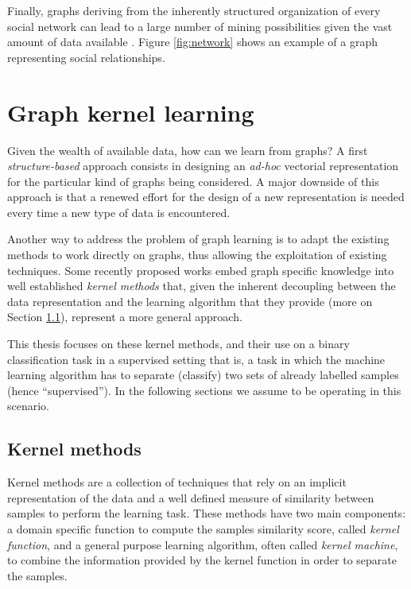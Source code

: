 Finally, graphs deriving from the inherently structured organization of every social
network can lead to a large number of mining possibilities given the vast
amount of data available \cite{gundecha2012mining}.
Figure \ref{fig:network} shows an example of a graph representing social relationships.

\section{Graph kernel learning}

Given the wealth of available data, how can we learn from graphs? A first \emph{structure-based}
approach consists in designing an \emph{ad-hoc} vectorial representation for the
particular kind of graphs being considered.
A major downside of this approach is that a renewed effort for the 
design of a new representation is needed every time a new type of data
is encountered.

Another way to address the problem of graph learning is to adapt the existing methods
to work directly on graphs, thus allowing the exploitation of existing techniques.
Some recently proposed works \cite{DBLP:conf/sdm/MartinoNS12, NIPS2009_3813}
embed graph specific knowledge into well established \emph{kernel methods}
that, given the inherent decoupling between the data representation and the learning
algorithm that they provide (more on Section \ref{subsec:introkm}), represent a
more general approach.

This thesis focuses on these kernel methods, and their use on a binary classification
task in a supervised setting that is, a task in which the machine learning algorithm
has to separate (classify) two sets of already labelled samples (hence ``supervised'').
In the following sections we assume to be operating in this scenario.

\subsection{Kernel methods}
\label{subsec:introkm}

Kernel methods are a collection of techniques that rely on an implicit representation
of the data and a well defined measure of similarity between samples to perform
the learning task.
These methods have two main components: a domain specific function to compute the
samples similarity score, called \emph{kernel function}, and a general purpose
learning algorithm, often called \emph{kernel machine}, to combine the information provided by the
kernel function in order to separate the samples.

